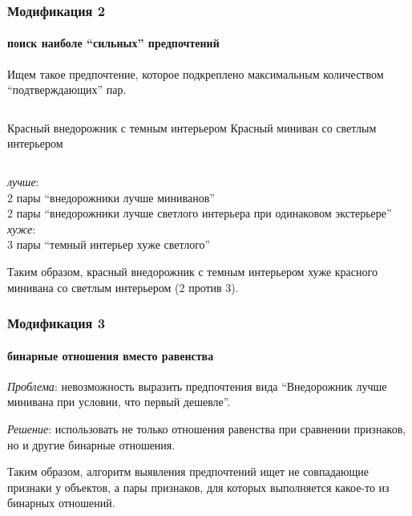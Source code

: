 \documentclass[xcolor=table]{beamer}
\theoremstyle{definition}
\begin{document}
	\begin{frame}
		\frametitle{Модификация 2}
		\framesubtitle{поиск наиболе ``сильных'' предпочтений}
		Ищем такое предпочтение, которое подкреплено максимальным количеством ``подтверждающих'' пар.
		\vspace{1.4em}
		\begin{columns}[c] 
			Красный внедорожник с темным интерьером
			Красный миниван со светлым интерьером
		\end{columns}
		\begin{center}
			\vspace{0.5em}
			\emph{лучше}: \\ 
			2 пары ``внедорожники лучше миниванов'' \\
			2 пары ``внедорожники лучше светлого интерьера при одинаковом экстерьере'' \\
			\vspace{1em}
			\emph{хуже}: \\
			3 пары ``темный интерьер хуже светлого''
		\end{center}
		
		\vspace{1.5em}
		Таким образом, красный внедорожник с темным интерьером {\color{red} хуже} красного минивана со светлым интерьером (2 против 3).
	\end{frame}
	
	\begin{frame}
		\frametitle{Модификация 3}
		\framesubtitle{бинарные отношения вместо равенства}
		
		\emph{Проблема}: невозможность выразить предпочтения вида ``Внедорожник лучше минивана при условии, что первый дешевле''.
		
		\pause
		
		\vspace{1em}
		\emph{Решение}: использовать не только отношения равенства при сравнении признаков, но и другие бинарные отношения.
		
		\pause
		
		\vspace{1em}
		Таким образом, алгоритм выявления предпочтений ищет не совпадающие признаки у объектов, а пары признаков, для которых выполняется какое-то из бинарных отношений.
	\end{frame}
	
\end{document}
